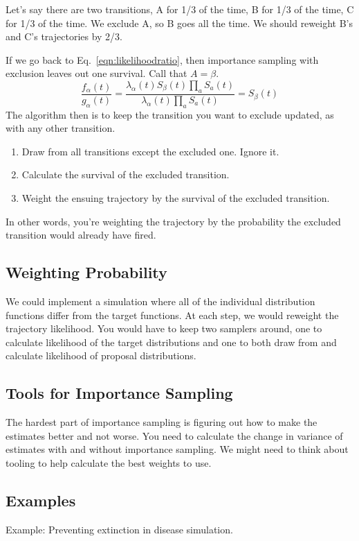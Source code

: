 \documentclass{article}
\begin{document}
Let's say there are two transitions, A for 1/3 of the time, B for 1/3 of the time, C for 1/3 of the time. We exclude A, so B goes all the time. We should reweight B's and C's trajectories by 2/3.

If we go back to Eq.~\ref{eqn:likelihoodratio}, then importance sampling with exclusion leaves out one survival. Call that $A=\beta$.
\begin{equation}
	\frac{f_\alpha(t)}{g_\alpha(t)} = \frac{\lambda_{\alpha}(t)S_\beta(t)\prod_{a}S_a(t)}{\lambda_{\alpha}(t)\prod_{a}S_a(t)} = S_\beta(t)
\end{equation}
The algorithm then is to keep the transition you want to exclude updated, as with any other transition.
\begin{enumerate}
	\item Draw from all transitions except the excluded one. Ignore it.
	\item Calculate the survival of the excluded transition.
	\item Weight the ensuing trajectory by the survival of the excluded transition.
\end{enumerate}
In other words, you're weighting the trajectory by the probability the excluded transition would already have fired.

\subsection{Weighting Probability}

We could implement a simulation where all of the individual distribution functions differ from the target functions. At each step, we would reweight the trajectory likelihood. You would have to keep two samplers around, one to calculate likelihood of the target distributions and one to both draw from and calculate likelihood of proposal distributions.

\subsection{Tools for Importance Sampling}

The hardest part of importance sampling is figuring out how to make the estimates better and not worse. You need to calculate the change in variance of estimates with and without importance sampling. We might need to think about tooling to help calculate the best weights to use.


\subsection{Examples}
Example: Preventing extinction in disease simulation.
\end{document}
